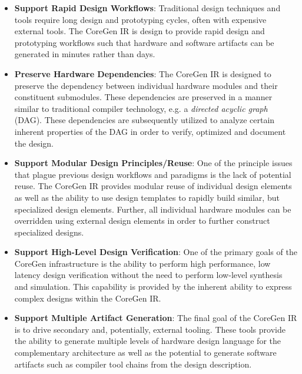 \documentclass{article}
\begin{document}
\begin{itemize}
\item \textbf{Support Rapid Design Workflows}: Traditional design techniques and tools require long 
design and prototyping cycles, often with expensive external tools.  The CoreGen IR is design to provide 
rapid design and prototyping workflows such that hardware and software artifacts can be generated in minutes 
rather than days.

\item \textbf{Preserve Hardware Dependencies}: The CoreGen IR is designed to preserve the dependency 
between individual hardware modules and their constituent submodules.  These dependencies are preserved 
in a manner similar to traditional compiler technology, e.g. a \textit{directed acyclic graph} (DAG).  These 
dependencies are subsequently utilized to analyze certain inherent properties of the DAG in order to 
verify, optimized and document the design.

\item \textbf{Support Modular Design Principles/Reuse}: One of the principle issues that plague previous 
design workflows and paradigms is the lack of potential reuse.  The CoreGen IR provides modular reuse 
of individual design elements as well as the ability to use design templates to rapidly build similar, but 
specialized design elements.  Further, all individual hardware modules can be overridden using external 
design elements in order to further construct specialized designs.

\item \textbf{Support High-Level Design Verification}: One of the primary goals of the CoreGen infrastructure 
is the ability to perform high performance, low latency design verification without the need to perform low-level 
synthesis and simulation.  This capability is provided by the inherent ability to express complex designs 
within the CoreGen IR.

\item \textbf{Support Multiple Artifact Generation}: The final goal of the CoreGen IR is to drive secondary 
and, potentially, external tooling.  These tools provide the ability to generate multiple levels of hardware 
design language for the complementary architecture as well as the potential to generate software 
artifacts such as compiler tool chains from the design description.
\end{itemize}
\end{document}
